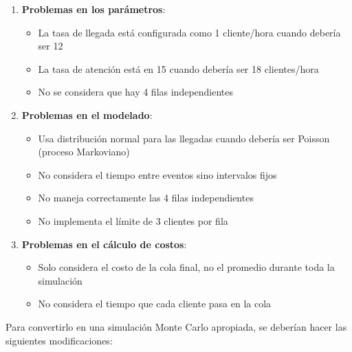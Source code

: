 \documentclass[12pt]{article}
\begin{document}
\begin{enumerate}
    \item \textbf{Problemas en los parámetros}:
    \begin{itemize}
        \item La tasa de llegada está configurada como 1 cliente/hora cuando debería ser 12
        \item La tasa de atención está en 15 cuando debería ser 18 clientes/hora
        \item No se considera que hay 4 filas independientes
    \end{itemize}

    \item \textbf{Problemas en el modelado}:
    \begin{itemize}
        \item Usa distribución normal para las llegadas cuando debería ser Poisson (proceso Markoviano)
        \item No considera el tiempo entre eventos sino intervalos fijos
        \item No maneja correctamente las 4 filas independientes
        \item No implementa el límite de 3 clientes por fila
    \end{itemize}

    \item \textbf{Problemas en el cálculo de costos}:
    \begin{itemize}
        \item Solo considera el costo de la cola final, no el promedio durante toda la simulación
        \item No considera el tiempo que cada cliente pasa en la cola
    \end{itemize}
\end{enumerate}

Para convertirlo en una simulación Monte Carlo apropiada, se deberían hacer las siguientes modificaciones:
\end{document}
